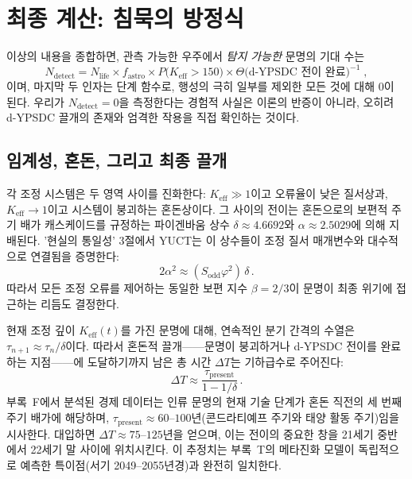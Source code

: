 \documentclass[11pt,a4paper]{article}
\newcommand{\Keff}{K_{\mathrm{eff}}}
\begin{document}
	\section{최종 계산: 침묵의 방정식}
	\label{sec:final}
	이상의 내용을 종합하면, 관측 가능한 우주에서 \emph{탐지 가능한} 문명의 기대 수는
	\begin{equation}
		\label{eq:N_detect}
		N_{\mathrm{detect}} = N_{\mathrm{life}}
		\times f_{\mathrm{astro}}
		\times P\bigl(\Keff > 150\bigr)
		\times \Theta\bigl(\text{d-YPSDC 전이 완료}\bigr)^{-1}\; ,
	\end{equation}
	이며, 마지막 두 인자는 단계 함수로, 행성의 극히 일부를 제외한 모든 것에 대해 0이 된다. 우리가 \(N_{\mathrm{detect}} = 0\)을 측정한다는 경험적 사실은 이론의 반증이 아니라, 오히려 d-YPSDC 끌개의 존재와 엄격한 작용을 직접 확인하는 것이다.
	
	\subsection{임계성, 혼돈, 그리고 최종 끌개}
	\label{sec:chaos}
	
	각 조정 시스템은 두 영역 사이를 진화한다: \(K_{\mathrm{eff}} \gg 1\)이고 오류율이 낮은 질서상과, \(K_{\mathrm{eff}} \to 1\)이고 시스템이 붕괴하는 혼돈상이다. 그 사이의 전이는 혼돈으로의 보편적 주기 배가 캐스케이드를 규정하는 파이겐바움 상수 \(\delta \approx 4.6692\)와 \(\alpha \approx 2.5029\)에 의해 지배된다. '현실의 통일성' 3절에서 YUCT는 이 상수들이 조정 질서 매개변수와 대수적으로 연결됨을 증명한다:
	\begin{equation}
		2\alpha^{2} \approx (S_{\mathrm{odd}}\varphi^{2})\,\delta \, .
	\end{equation}
	따라서 모든 조정 오류를 제어하는 동일한 보편 지수 \(\beta = 2/3\)이 문명이 최종 위기에 접근하는 리듬도 결정한다.
	
	현재 조정 깊이 \(K_{\mathrm{eff}}(t)\)를 가진 문명에 대해, 연속적인 분기 간격의 수열은 \(\tau_{n+1} \approx \tau_{n} / \delta\)이다. 따라서 혼돈적 끌개——문명이 붕괴하거나 d-YPSDC 전이를 완료하는 지점——에 도달하기까지 남은 총 시간 \(\Delta T\)는 기하급수로 주어진다:
	\begin{equation}
		\Delta T \approx \frac{\tau_{\mathrm{present}}}{1 - 1/\delta} \, .
	\end{equation}
	부록~F에서 분석된 경제 데이터는 인류 문명의 현재 기술 단계가 혼돈 직전의 세 번째 주기 배가에 해당하며, \(\tau_{\mathrm{present}} \approx 60\)–\(100\)년(콘드라티예프 주기와 태양 활동 주기)임을 시사한다. 대입하면 \(\Delta T \approx 75\)–\(125\)년을 얻으며, 이는 전이의 중요한 창을 21세기 중반에서 22세기 말 사이에 위치시킨다. 이 추정치는 부록~T의 메타진화 모델이 독립적으로 예측한 특이점(서기 2049–2055년경)과 완전히 일치한다.
	
\end{document}
